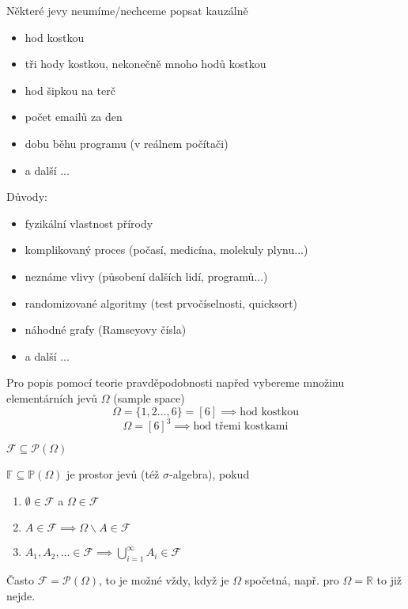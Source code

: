 \documentclass[../main.tex]{subfiles}
\begin{document}
\vspace{5mm}
\noindent 
Některé jevy neumíme/nechceme popsat kauzálně
\begin{itemize}
    \item hod kostkou
    \item tři hody kostkou, nekonečně mnoho hodů kostkou
    \item hod šipkou na terč
    \item počet emailů za den
    \item dobu běhu programu (v reálnem počítači)
    \item a další ...
\end{itemize}
Důvody:
\begin{itemize}
    \item fyzikální vlastnost přírody
    \item komplikovaný proces (počasí, medicína, molekuly plynu...)
    \item neznáme vlivy (působení dalších lidí, programů...)
    \item randomizované algoritmy (test prvočíselnosti, quicksort)
    \item náhodné grafy (Ramseyovy čísla)
    \item a další ...
\end{itemize}


\noindent
Pro popis pomocí teorie pravděpodobnosti napřed vybereme množinu elementárních jevů $\Omega$
(sample space)
\[\Omega = \{1,2\dots,6\} = [6] \implies \text{hod kostkou}\]
\[\Omega = [6]^3 \implies \text{hod třemi kostkami}\]

\begin{definition}
    $\mathcal{F} \subseteq \mathcal{P}(\Omega)$

    $\mathbb{F} \subseteq \mathbb{P}(\Omega)$ je prostor jevů (též $\sigma$-algebra), pokud
    \begin{enumerate}
        \item $\emptyset \in \mathcal{F}$ a $\Omega \in \mathcal{F}$
        \item $A \in \mathcal{F} \implies \Omega \backslash A \in \mathcal{F}$
        \item $A_1,A_2,... \in \mathcal{F} \implies \bigcup_{i=1}^{\infty}A_i \in \mathcal{F}$
    \end{enumerate}
\end{definition}

\noindent
Často $\mathcal{F} = \mathcal{P}(\Omega)$, to je možné vždy, když je $\Omega$ spočetná,
např. pro $\Omega = \mathbb{R}$ to již nejde.
\end{document}
